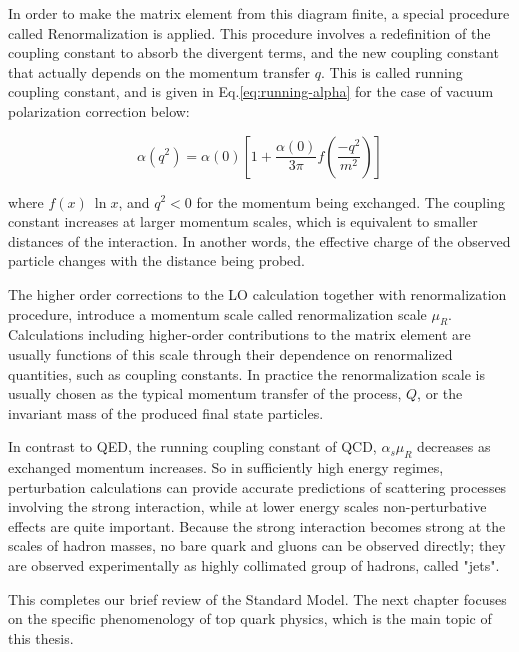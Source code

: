In order to make the matrix element from this diagram finite, a special procedure called Renormalization is applied. This procedure involves a redefinition of the coupling constant to absorb the divergent terms, and the new coupling constant that actually depends on the momentum transfer $q$. This is called running coupling constant, and is given in Eq.\ref{eq:running-alpha} for the case of vacuum polarization correction below:

\begin{equation}
\alpha(q^2) = \alpha(0) \left[ 1+\frac{\alpha(0)}{3\pi} f( \frac{-q^2}{m^2} ) \right]
\label{eq:running-alpha}
\end{equation}

where $f(x)~\ln x$, and $q^2<0$ for the momentum being exchanged. The coupling constant increases at larger momentum scales, which is equivalent to smaller distances of the interaction. In another words, the effective charge of the observed particle changes with the distance being probed. 

The higher order corrections to the LO calculation together with renormalization procedure, introduce a momentum scale called renormalization scale $\mu_R$.  Calculations including higher-order contributions to the matrix element are usually functions of this scale through their dependence on renormalized quantities, such as coupling constants. In practice the renormalization scale is usually chosen as the typical momentum transfer of the process, $Q$, or the invariant mass of the produced final state particles.

In contrast to QED, the running coupling constant of QCD, $\alpha_s{\mu_R}$ decreases as exchanged momentum increases. So in sufficiently high energy regimes, perturbation calculations can provide accurate predictions of scattering processes involving the strong interaction, while at lower energy scales non-perturbative effects are quite important. Because the strong interaction becomes strong at the scales of hadron masses, no bare quark and gluons can be observed directly; they are observed experimentally as highly collimated group of hadrons, called "jets".

This completes our brief review of the Standard Model.  The next chapter focuses on the specific phenomenology of top quark physics, which is the main topic of this thesis.


 